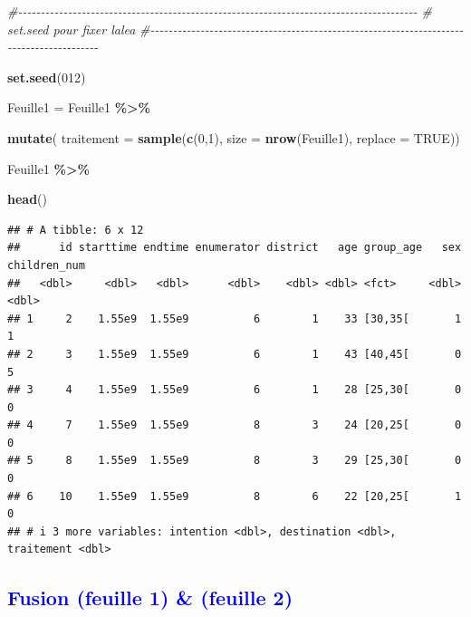 \documentclass[
]{article}
\newenvironment{Shaded}{\begin{snugshade}}{\end{snugshade}}
\newcommand{\AttributeTok}[1]{\textcolor[rgb]{0.13,0.29,0.53}{#1}}
\newcommand{\CommentTok}[1]{\textcolor[rgb]{0.56,0.35,0.01}{\textit{#1}}}
\newcommand{\ConstantTok}[1]{\textcolor[rgb]{0.56,0.35,0.01}{#1}}
\newcommand{\DecValTok}[1]{\textcolor[rgb]{0.00,0.00,0.81}{#1}}
\newcommand{\FunctionTok}[1]{\textcolor[rgb]{0.13,0.29,0.53}{\textbf{#1}}}
\newcommand{\NormalTok}[1]{#1}
\newcommand{\OtherTok}[1]{\textcolor[rgb]{0.56,0.35,0.01}{#1}}
\newcommand{\SpecialCharTok}[1]{\textcolor[rgb]{0.81,0.36,0.00}{\textbf{#1}}}
\begin{document}
\begin{Shaded}
\begin{Highlighting}[]
\CommentTok{\#{-}{-}{-}{-}{-}{-}{-}{-}{-}{-}{-}{-}{-}{-}{-}{-}{-}{-}{-}{-}{-}{-}{-}{-}{-}{-}{-}{-}{-}{-}{-}{-}{-}{-}{-}{-}{-}{-}{-}{-}{-}{-}{-}{-}{-}{-}{-}{-}{-}{-}{-}{-}{-}{-}{-}{-}{-}{-}{-}{-}{-}{-}{-}{-}{-}{-}{-}{-}{-}{-}{-}{-}{-}{-}{-}{-}{-}{-}{-}{-}{-}{-}{-}{-}{-}{-}{-}{-}}
\CommentTok{\#    set.seed pour fixer l\textquotesingle{}alea}
\CommentTok{\#{-}{-}{-}{-}{-}{-}{-}{-}{-}{-}{-}{-}{-}{-}{-}{-}{-}{-}{-}{-}{-}{-}{-}{-}{-}{-}{-}{-}{-}{-}{-}{-}{-}{-}{-}{-}{-}{-}{-}{-}{-}{-}{-}{-}{-}{-}{-}{-}{-}{-}{-}{-}{-}{-}{-}{-}{-}{-}{-}{-}{-}{-}{-}{-}{-}{-}{-}{-}{-}{-}{-}{-}{-}{-}{-}{-}{-}{-}{-}{-}{-}{-}{-}{-}{-}{-}{-}{-}{-}}

\FunctionTok{set.seed}\NormalTok{(}\DecValTok{012}\NormalTok{)}

\NormalTok{Feuille1 }\OtherTok{=}\NormalTok{ Feuille1 }\SpecialCharTok{\%\textgreater{}\%}
  
\FunctionTok{mutate}\NormalTok{( }\AttributeTok{traitement =} \FunctionTok{sample}\NormalTok{(}\FunctionTok{c}\NormalTok{(}\DecValTok{0}\NormalTok{,}\DecValTok{1}\NormalTok{), }\AttributeTok{size =} \FunctionTok{nrow}\NormalTok{(Feuille1), }\AttributeTok{replace =} \ConstantTok{TRUE}\NormalTok{))}


\NormalTok{Feuille1 }\SpecialCharTok{\%\textgreater{}\%}
  
  \FunctionTok{head}\NormalTok{()}
\end{Highlighting}
\end{Shaded}

\begin{verbatim}
## # A tibble: 6 x 12
##      id starttime endtime enumerator district   age group_age   sex children_num
##   <dbl>     <dbl>   <dbl>      <dbl>    <dbl> <dbl> <fct>     <dbl>        <dbl>
## 1     2    1.55e9  1.55e9          6        1    33 [30,35[       1            1
## 2     3    1.55e9  1.55e9          6        1    43 [40,45[       0            5
## 3     4    1.55e9  1.55e9          6        1    28 [25,30[       0            0
## 4     7    1.55e9  1.55e9          8        3    24 [20,25[       0            0
## 5     8    1.55e9  1.55e9          8        3    29 [25,30[       0            0
## 6    10    1.55e9  1.55e9          8        6    22 [20,25[       1            0
## # i 3 more variables: intention <dbl>, destination <dbl>, traitement <dbl>
\end{verbatim}

\textcolor{blue}{\subsection{Fusion (feuille 1) \& (feuille 2) }}
\end{document}
